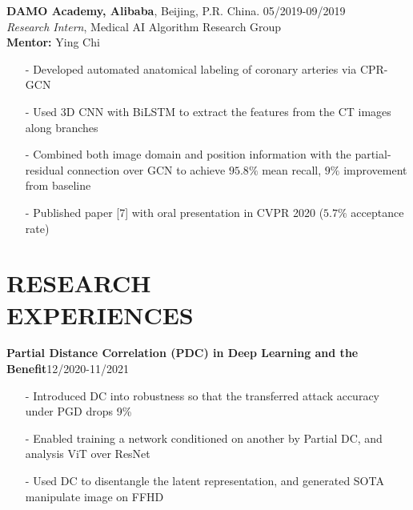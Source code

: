 \documentclass[margin]{res}
\begin{document}
\begin{resume}
                \vspace{-1em}  
                
                \textbf{DAMO Academy, Alibaba}, Beijing, P.R. China. \hfill 05/2019-09/2019\\
                {\it Research Intern}, Medical AI Algorithm Research Group\\
                \textbf{Mentor:} Ying Chi
                \begin{itemize}\itemsep -2.2pt %
                 \item[-] Developed automated anatomical labeling of coronary arteries via CPR-GCN
                 \item[-] Used 3D CNN with BiLSTM to extract the features from the CT images along branches
                 \item[-] Combined both image domain and position information with the partial-residual connection over GCN to achieve $95.8\%$ mean recall, $9\%$ improvement from baseline
                 \item[-] Published paper [7] with oral presentation in CVPR 2020 ($5.7\%$ acceptance rate)
                 \end{itemize}

\vspace{-1em}
\section{RESEARCH \\ EXPERIENCES}
				\textbf{Partial Distance Correlation (PDC) in Deep Learning and the Benefit}\hfill 12/2020-11/2021
                \begin{itemize}\itemsep -2.2pt %
                 \item[-] Introduced DC into robustness so that the transferred attack accuracy under PGD drops 9\%
                 \item[-] Enabled training a network conditioned on another by Partial DC, and analysis ViT over ResNet
                 \item[-] Used DC to disentangle the latent representation, and generated SOTA manipulate image on FFHD
                 \end{itemize}


\end{resume}
\end{document}
